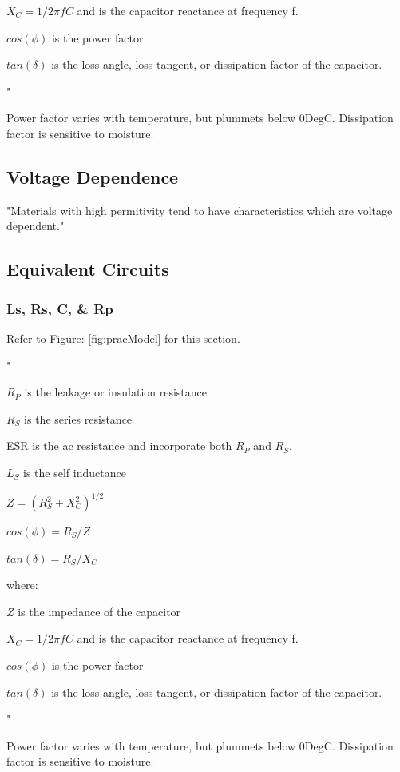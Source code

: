 $X_C = 1 / 2\pi fC$ and is the capacitor reactance at frequency f.

$cos(\phi)$ is the power factor

$tan(\delta)$ is the loss angle, loss tangent, or dissipation factor of the capacitor.

"

\cite{disc_comp}

Power factor varies with temperature, but plummets below 0DegC.
Dissipation factor is sensitive to moisture.\cite{disc_comp}

\subsection{Voltage Dependence}

"Materials with high permitivity tend to have characteristics which are voltage dependent."\cite{disc_comp}

\subsection{Equivalent Circuits}
\subsubsection{Ls, Rs, C, \& Rp}

Refer to Figure: \ref{fig:pracModel} for this section.

"

$R_P$ is the leakage or insulation resistance

$R_S$ is the series resistance

ESR is the ac resistance and incorporate both $R_P$ and $R_S$.

$L_S$ is the self inductance 

$Z = (R_S^2 + X_C^2)^{1/2}$

$cos(\phi) = R_S / Z$

$tan(\delta) = R_S / X_C$

where:

$Z$ is the impedance of the capacitor

$X_C = 1 / 2\pi fC$ and is the capacitor reactance at frequency f.

$cos(\phi)$ is the power factor

$tan(\delta)$ is the loss angle, loss tangent, or dissipation factor of the capacitor.

"

\cite{disc_comp}

Power factor varies with temperature, but plummets below 0DegC.
Dissipation factor is sensitive to moisture.\cite{disc_comp}



